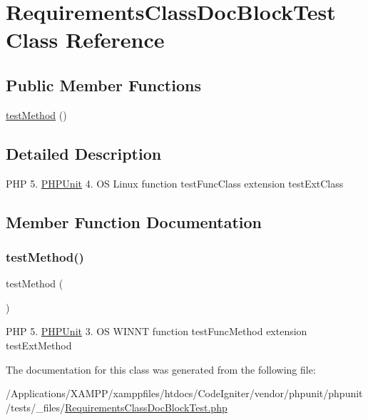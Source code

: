 \hypertarget{class_requirements_class_doc_block_test}{}\section{Requirements\+Class\+Doc\+Block\+Test Class Reference}
\label{class_requirements_class_doc_block_test}
\subsection*{Public Member Functions}
\begin{DoxyCompactItemize}
\item 
\mbox{\hyperlink{class_requirements_class_doc_block_test_a81013da9dbccb5e8639de075cc0f0a81}{test\+Method}} ()
\end{DoxyCompactItemize}


\subsection{Detailed Description}
P\+HP 5.  \mbox{\hyperlink{namespace_p_h_p_unit}{P\+H\+P\+Unit}} 4.  OS Linux  function test\+Func\+Class  extension test\+Ext\+Class 

\subsection{Member Function Documentation}
\mbox{\label{class_requirements_class_doc_block_test_a81013da9dbccb5e8639de075cc0f0a81}} 
\subsubsection{\texorpdfstring{test\+Method()}{testMethod()}}
{\footnotesize\ttfamily test\+Method (\begin{DoxyParamCaption}{ }\end{DoxyParamCaption})}

P\+HP 5.  \mbox{\hyperlink{namespace_p_h_p_unit}{P\+H\+P\+Unit}} 3.  OS W\+I\+N\+NT  function test\+Func\+Method  extension test\+Ext\+Method 

The documentation for this class was generated from the following file\+:\begin{DoxyCompactItemize}
\item 
/\+Applications/\+X\+A\+M\+P\+P/xamppfiles/htdocs/\+Code\+Igniter/vendor/phpunit/phpunit/tests/\+\_\+files/\mbox{\hyperlink{_requirements_class_doc_block_test_8php}{Requirements\+Class\+Doc\+Block\+Test.\+php}}\end{DoxyCompactItemize}
